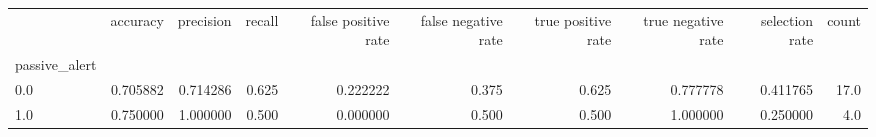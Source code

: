 \begin{tabular}{lrrrrrrrrr}
\toprule
{} &  accuracy &  precision &  recall &  false positive rate &  false negative rate &  true positive rate &  true negative rate &  selection rate &  count \\
passive\_alert &           &            &         &                      &                      &                     &                     &                 &        \\
\midrule
0.0           &  0.705882 &   0.714286 &   0.625 &             0.222222 &                0.375 &               0.625 &            0.777778 &        0.411765 &   17.0 \\
1.0           &  0.750000 &   1.000000 &   0.500 &             0.000000 &                0.500 &               0.500 &            1.000000 &        0.250000 &    4.0 \\
\bottomrule
\end{tabular}
